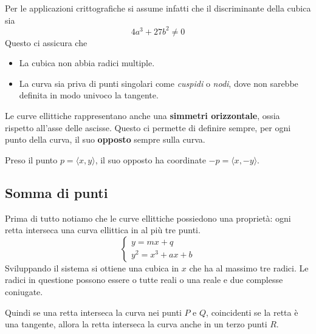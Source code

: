 Per le applicazioni crittografiche si assume infatti che il discriminante della cubica sia
\[ 4 a^3 + 27 b^2 \neq 0 \]
Questo ci assicura che
\begin{itemize}
	\item La cubica non abbia radici multiple.
	\item La curva sia priva di punti singolari come \emph{cuspidi} o \emph{nodi}, dove non sarebbe definita in
	      modo univoco la tangente.
\end{itemize}
Le curve ellittiche rappresentano anche una \textbf{simmetri orizzontale}, ossia rispetto all'asse delle ascisse.
Questo ci permette di definire sempre, per ogni punto della curva, il suo \textbf{opposto} sempre sulla curva.

Preso il punto $p = \langle x, y \rangle$, il suo opposto ha coordinate $-p = \langle x, -y \rangle$.

\subsection{Somma di punti}
Prima di tutto notiamo che le curve ellittiche possiedono una propriet\`a: ogni retta interseca una curva ellittica
in al pi\`u tre punti.
\[
	\begin{cases}
		y = mx + q \\
		y^2 = x^3 + ax + b
	\end{cases}
\]
Sviluppando il sistema si ottiene una cubica in $x$ che ha al massimo tre radici. Le radici in questione possono
essere o tutte reali o una reale e due complesse coniugate.

Quindi se una retta interseca la curva nei punti $P$ e $Q$, coincidenti se la retta \`e una tangente, allora la
retta interseca la curva anche in un terzo punti $R$.

